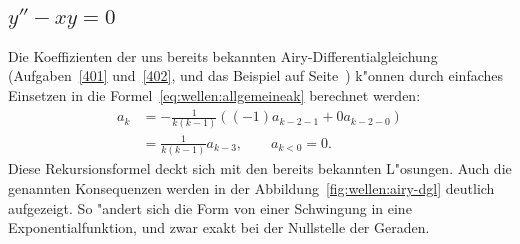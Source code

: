 \subsection{\texorpdfstring{$y''-xy = 0$}{y''-xy = 0}}
Die Koeffizienten der uns bereits bekannten Airy-Differentialgleichung
(Aufgaben~\ref{401} und~\ref{402}, und das Beispiel auf
Seite~\pageref{komplex:airydgl})
k"onnen 
durch einfaches Einsetzen in die Formel~\eqref{eq:wellen:allgemeineak} 
berechnet werden:
\begin{equation*}
	\begin{split}
		a_k &= -\frac{1}{k(k-1)} ((-1) a_{k-2-1} + 
		0 a_{k-2-0})
		\\
		&= \frac{1}{k(k-1)} a_{k-3}, \qquad a_{k < 0} = 0.
	\end{split}
\end{equation*}
Diese Rekursionsformel deckt sich mit den bereits bekannten L"osungen.
Auch die genannten Konsequenzen werden in der 
Abbildung~\ref{fig:wellen:airy-dgl} deutlich aufgezeigt. So "andert sich die 
Form von einer Schwingung in eine Exponentialfunktion, und zwar exakt bei der 
Nullstelle der Geraden.

